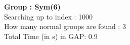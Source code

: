 \textbf{Group : Sym(6)}\\
Searching up to index : 1000\\
How many normal groups are found : 3\\
Total Time (in s) in GAP: 0.9\\

